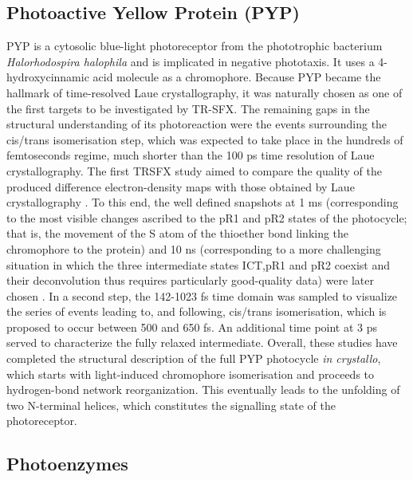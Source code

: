 \subsection{Photoactive Yellow Protein (PYP)}\label{sec:PYP}
PYP is a cytosolic blue-light photoreceptor from the phototrophic bacterium \textit{Halorhodospira halophila} and is implicated in negative phototaxis. It uses a 4-hydroxycinnamic acid molecule as a chromophore. Because PYP became the hallmark of time-resolved Laue crystallography, it was naturally chosen as one of the first targets to be investigated by TR-SFX. The remaining gaps in the structural understanding of its photoreaction were the events surrounding the cis/trans isomerisation step, which was expected to take place in the hundreds of femtoseconds regime, much shorter than the 100 ps time resolution of Laue crystallography. The first TRSFX study aimed to compare the quality of the produced difference electron-density maps with those obtained by Laue crystallography \parencite{tenboerTimeresolvedSerialCrystallography2014}. To this end, the well defined snapshots at 1 ms (corresponding to the most visible changes ascribed to the pR1 and pR2 states of the photocycle; that is, the movement of the S atom of the thioether bond linking the chromophore to the protein) and 10 ns (corresponding to a more challenging situation in which the three intermediate states ICT,pR1 and pR2 coexist and their deconvolution thus requires particularly good-quality data) were later chosen \parencite{pandeFemtosecondStructuralDynamics2016}. In a second step, the 142-1023 fs time domain was sampled to visualize the series of events leading to, and following, cis/trans isomerisation, which is proposed to occur between 500 and 650 fs. An additional time point at 3 ps served to characterize the fully relaxed intermediate. Overall, these studies have completed the structural description of the full PYP photocycle \textit{in crystallo}, which starts with light-induced chromophore isomerisation and proceeds to hydrogen-bond network reorganization. This eventually leads to the unfolding of two N-terminal helices, which constitutes the signalling state of the photoreceptor.

\subsection{Photoenzymes}\label{sec:photoenzymes}

